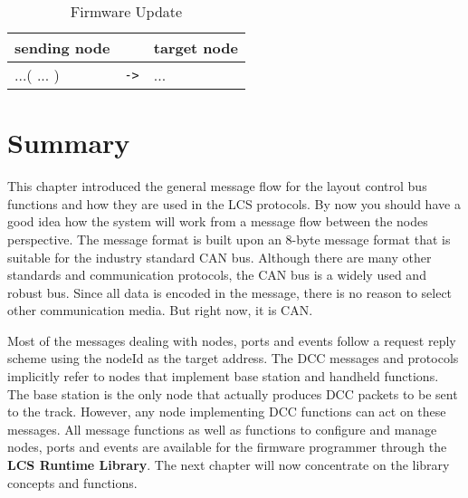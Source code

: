 \begin{table}[ht!]
    \begin{center}
        \caption{Firmware Update}
        \begin{tabular}{|p{}| c |p{}|}
            \toprule
            \textbf{sending node} & & \textbf{ target node} \\
            \midrule
            ...( ... ) & \texttt{->} & ... \\
            \bottomrule
        \end{tabular}
    \end{center}
\end{table}

\section{Summary}

This chapter introduced the general message flow for the layout control bus functions and how they are used in the LCS protocols. By now you should have a good idea how the system will work from a message flow between the nodes perspective. The message format is built upon an 8-byte message format that is suitable for the industry standard CAN bus. Although there are many other standards and communication protocols, the CAN bus is a widely used and robust bus. Since all data is encoded in the message, there is no reason to select other communication media. But right now, it is CAN.

Most of the messages dealing with nodes, ports and events follow a request reply scheme using the nodeId as the target address. The DCC messages and protocols implicitly refer to nodes that implement base station and handheld functions. The base station is the only node that actually produces DCC packets to be sent to the track. However, any node implementing DCC functions can act on these messages. All message functions as well as functions to configure and manage nodes, ports and events are available for the firmware programmer through the \textbf{LCS Runtime Library}. The next chapter will now concentrate on the library concepts and functions.
